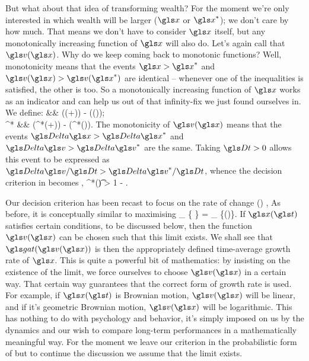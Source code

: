 
But what about that idea of transforming wealth? 
For the moment we're only interested in which wealth will be larger ($\x$ or $\x^*$); we don't care by how much. 
That means we don't have to consider $\x$ itself, but any monotonically increasing function of $\x$ will also do. Let's again call that $\gv(\x)$. Why do we keep coming back to monotonic functions? Well, monotonicity means that the events $\x>\x^*$ and $\gv(\x)>\gv(\x^*)$ are identical -- whenever one of the inequalities is satisfied, the other is too. So a monotonically increasing function of $\x$ works as an indicator and can help us out of that infinity-fix we just found ourselves in. We define:
\bea
\Dv &\equiv& \gv(\x(\tn+\Dt)) - \gv(\x(\tn));\\
\Dv^* &\equiv& \gv(\x^*(\tn+\Dt)) - \gv(\x^*(\tn)).
\eea
The monotonicity of $\gv(\x)$ means that the events $\D\x>\D\x^*$ and 
$\Dv>\Dv^*$ are the same. Taking $\Dt>0$ allows this event to be 
expressed as $\Dv/\Dt>\Dv^*/\Dt$, whence the decision criterion in 
 becomes
\be
\forall \eps, \x^*(\t) \quad \exists \Dt \quad {} \quad \prob{\frac{\Dv}{\Dt} > \frac{\Dv^*}{\Dt}} > 1 - \epsilon.
\ee

Our decision criterion has been recast to focus on the rate of change
\be
\gad(\gu) \equiv \frac{\Du}{\Dt},
\ee
As before, it is conceptually similar to maximising
\be
\gat \equiv \lim_{\Dt\to\infty}  \left\{ \frac{\Dv(\x)}{\Dt} \right\} =  \lim_{\Dt\to\infty} \{\gad(\gv)\}.
\ee
If $\x(\t)$ satisfies certain conditions, to be discussed below, then the function 
$\gv(\x)$ can be chosen such that this limit exists. We shall see that $\gat(\gv(\x))$ is then the 
appropriately defined time-average growth rate of $\x$. 
This is quite a powerful
bit of mathematics: by insisting on the existence of the limit, we
force ourselves to choose $\gv(\x)$ in a certain way. That certain way guarantees that
the correct form of growth rate is used. For example, if $\x(\t)$ is Brownian motion, $\gv(\x)$
will be linear, and if it's geometric Brownian motion, $\gv(\x)$ will be logarithmic. 
This has nothing to do with psychology and behavior, it's simply imposed on us by the dynamics and our wish to compare long-term performances in a mathematically meaningful way.
For the moment we leave our criterion in the probabilistic form of 
but to continue the discussion we assume that the limit  exists.


